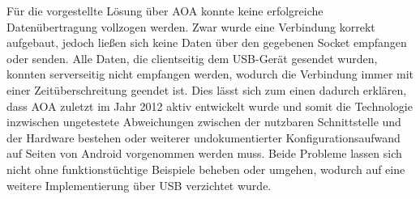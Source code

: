         Für die vorgestellte Lösung über AOA konnte keine erfolgreiche Datenübertragung vollzogen werden. Zwar wurde eine Verbindung korrekt aufgebaut, jedoch ließen sich keine Daten über den gegebenen Socket empfangen oder senden. Alle Daten, die clientseitig dem USB-Gerät gesendet wurden, konnten serverseitig nicht empfangen werden, wodurch die Verbindung immer mit einer Zeitüberschreitung geendet ist. Dies lässt sich zum einen dadurch erklären, dass AOA zuletzt im Jahr 2012 aktiv entwickelt wurde  und somit die Technologie inzwischen ungetestete Abweichungen zwischen der nutzbaren Schnittstelle und der Hardware bestehen oder weiterer undokumentierter Konfigurationsaufwand auf Seiten von Android vorgenommen werden muss. Beide Probleme lassen sich nicht ohne funktionstüchtige Beispiele beheben oder umgehen, wodurch auf eine weitere Implementierung über USB verzichtet wurde.